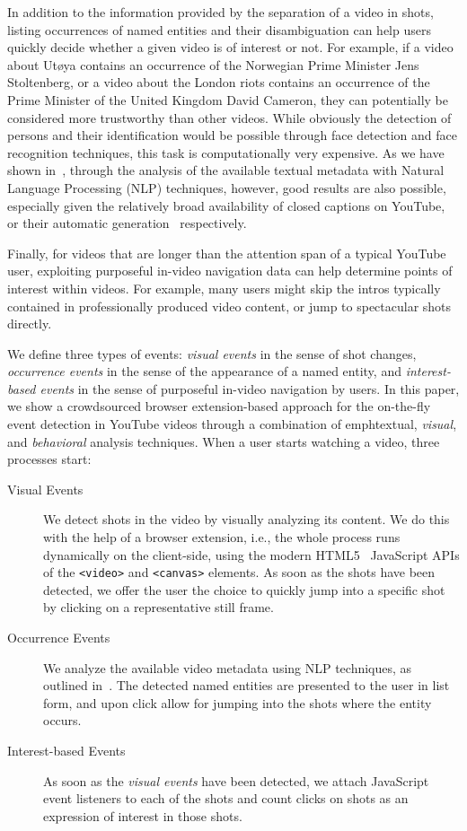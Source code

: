 \documentclass[runningheads,a4paper]{llncs}
\begin{document}
In addition to the information provided by the separation of a video in shots, listing occurrences of named entities and their disambiguation can help users quickly decide whether a given video is of interest or not. For example, if a video about Ut\o ya contains an occurrence of the Norwegian Prime Minister Jens Stoltenberg, or a video about the London riots contains an occurrence of the Prime Minister of the United Kingdom David Cameron, they can potentially be considered more trustworthy than other videos. While obviously the detection of persons and their identification would be possible through face detection and face recognition techniques, this task is computationally very expensive. As we have shown in~\cite{semwebvid}, through the analysis of the available textual metadata with Natural Language Processing (NLP) techniques, however, good results are also possible, especially given the relatively broad availability of closed captions on YouTube, or their automatic generation~\cite{youtubecaptions} respectively.

Finally, for videos that are longer than the attention span of a typical YouTube user, exploiting purposeful in-video navigation data can help determine points of interest within videos. For example, many users might skip the intros typically contained in professionally produced video content, or jump to spectacular shots directly. 

We define three types of events: \emph{visual events} in the sense of shot changes, \emph{occurrence events} in the sense of the appearance of a named entity, and \emph{interest-based events} in the sense of purposeful in-video navigation by users. In this paper, we show a crowdsourced browser extension-based  approach for the on-the-fly event detection in YouTube videos through a combination of emph{textual}, \emph{visual}, and \emph{behavioral} analysis techniques. When a user starts watching a video, three processes start:

\begin{description}
  \item[Visual Events] We detect shots in the video by visually analyzing its content. We do this with the help of a browser extension, i.e., the whole process runs dynamically on the client-side, using the modern HTML5~\cite{w3c_html5} JavaScript APIs of the \texttt{<video>} and \texttt{<canvas>} elements. As soon as the shots have been detected, we offer the user the choice to quickly jump into a specific shot by clicking on a representative still frame.
  \item[Occurrence Events] We analyze the available video metadata using NLP techniques, as outlined in~\cite{semwebvid}. The detected named entities are presented to the user in list form, and upon click allow for jumping into the  shots where the entity occurs.
  \item[Interest-based Events] As soon as the \emph{visual events} have been detected, we attach JavaScript event listeners to each of the shots and count clicks on shots as an expression of interest in those shots.
\end{description} 
 
\end{document}
